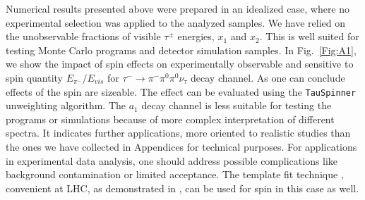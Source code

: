 \documentclass{article}
\begin{document}
Numerical results presented above were prepared in an idealized case,
where no  experimental selection was applied to the analyzed samples. We have relied
on the unobservable 
fractions of visible $\tau^\pm$ energies, $x_1$ and $x_2$.  This is well suited
for testing Monte Carlo programs and detector simulation samples. 
In Fig.~\ref{Fig:A1}, we show the impact of spin effects on experimentally observable
and sensitive to spin quantity $E_{\pi^-} / E_{vis}$  for  $\tau^- \to \pi^- \pi^0\pi^0 \nu_\tau$ decay channel.
As one can conclude effects of the spin are sizeable. The effect
can be evaluated  using the {\tt TauSpinner} unweighting algorithm. The $a_1$ decay channel
is less suitable for testing the programs or simulations 
because of more complex interpretation of different spectra. It indicates further applications, more oriented to 
realistic studies than the ones we have collected in Appendices for technical purposes.
For applications in experimental data analysis, one should address possible complications
like background contamination or limited acceptance. 
The template fit technique  \cite{Heister:2001uh},  convenient at LHC, 
as demonstrated  in \cite{Aad:2012cia}, can be used for spin in this case
as well.
\end{document}
